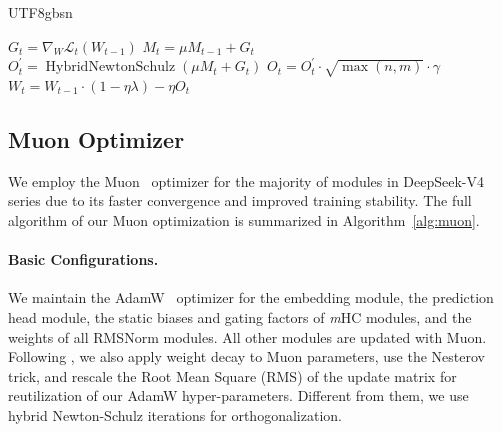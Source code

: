 \documentclass[11pt, a4paper, logo, copyright, nonumbering]{deepseek}
\newcommand{\dsviv}{DeepSeek-V4}
\newcommand{\mhc}{\textit{m}HC}
\begin{document}
\begin{CJK*}{UTF8}{gbsn}
\begin{algorithm}[t]
\caption{Muon Optimizer for \dsviv{}}
\label{alg:muon}
\begin{algorithmic}[1]
        \State $G_t = \nabla_{W} \mathcal{L}_t(W_{t-1})$ 
        \State $M_t = \mu M_{t-1} + G_t$ 
        \State $O^{\prime}_t = \operatorname{HybridNewtonSchulz}(\mu M_t + G_t)$ 
        \State $O_t = O^{\prime}_t \cdot \sqrt{\max(n, m)} \cdot \gamma$ 
        \State $W_t = W_{t-1} \cdot \left( 1 - \eta \lambda \right) - \eta O_t$ 
    \EndFor
\EndFor
\end{algorithmic}
\end{algorithm}

\subsection{Muon Optimizer}

We employ the Muon~\citep{muon,muon_kimi} optimizer for the majority of modules in \dsviv{} series due to its faster convergence and improved training stability.
The full algorithm of our Muon optimization is summarized in Algorithm~\ref{alg:muon}.

\paragraph{Basic Configurations.}
We maintain the AdamW~\citep{adamW} optimizer for the embedding module, the prediction head module, the static biases and gating factors of \mhc{} modules, and the weights of all RMSNorm modules. 
All other modules are updated with Muon.
Following \citet{muon_kimi}, we also apply weight decay to Muon parameters, use the Nesterov~\citep{nesterov,muon} trick, and rescale the Root Mean Square (RMS) of the update matrix for reutilization of our AdamW hyper-parameters.
Different from them, we use hybrid Newton-Schulz iterations for orthogonalization.


\end{CJK*}
\end{document}
